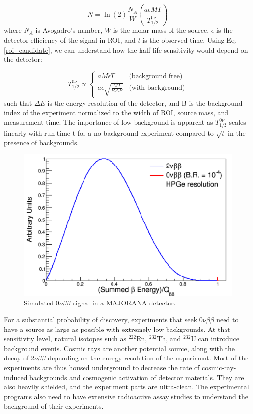 \begin{equation}\label{roi_candidate}
N=\ln(2)\frac{N_A}{W}\left(\frac{a\epsilon MT}{T^{0\nu}_{1/2}}\right)
\end{equation}
where $N_A$ is Avogadro's number, $W$ is the molar mass of the source, $\epsilon$ is the detector efficiency of the signal in ROI, and $t$ is the observed time. Using Eq. \ref{roi_candidate}, we can understand how the half-life sensitivity would depend on the detector:

\begin{equation}\label{det_sensitivity}
T^{0\nu}_{1/2} \propto
    \begin{cases}
    aM\epsilon T & \text{(background free)}\\
    a\epsilon\sqrt{\frac{MT}{B\Delta E}} & \text{(with background)}
    \end{cases}       
\end{equation}
such that $\Delta E$ is the energy resolution of the detector, and B is the background index of the experiment normalized to the width of ROI, source mass, and measurement time. The importance of low background is apparent as $T^{0\nu}_{1/2}$ scales linearly with run time t for a no background experiment compared to $\sqrt{t}$ in the presence of backgrounds.


\begin{figure}
\centering
\includegraphics[width=0.8\linewidth]{ch1/figs/DoubleBetaEnergy.png}
\caption{Simulated $0\nu\beta\beta$ signal in a MAJORANA detector. \cite{mjd_background}}
\label{mjd_background_fig}
\end{figure}

For a substantial probability of discovery, experiments that seek $0\nu\beta\beta$ need to have a source as large as possible with extremely low backgrounds. At that sensitivity level, natural isotopes such as $^{222}$Rn, $^{232}$Th, and $^{232}$U can introduce background events. Cosmic rays are another potential source, along with the decay of $2\nu\beta\beta$ depending on the energy resolution of the experiment. Most of the experiments are thus housed underground to decrease the rate of cosmic-ray-induced backgrounds and cosmogenic activation of detector materials. They are also heavily shielded, and the experiment parts are ultra-clean. The experimental programs also need to have extensive radioactive assay studies to understand the background of their experiments.


